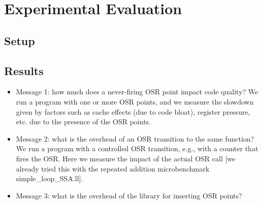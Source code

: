 \section{Experimental Evaluation}
\label{se:experiments}

\subsection{Setup}

\subsection{Results}

\begin{itemize}
\item Message 1: how much does a never-firing OSR point impact code quality? We run a program with one or more OSR points, and we measure the slowdown given by factors such as cache effects (due to code bloat), register pressure, etc. due to the presence of the OSR points.
\item Message 2: what is the overhead of an OSR transition to the same function? We run a program with a controlled OSR transition, e.g., with a counter that fires the OSR. Here we measure the impact of the actual OSR call [we already tried this with the repeated addition microbenchmark simple\_loop\_SSA.ll].
\item Message 3: what is the overhead of the library for inserting OSR points?
\end{itemize}


  
  